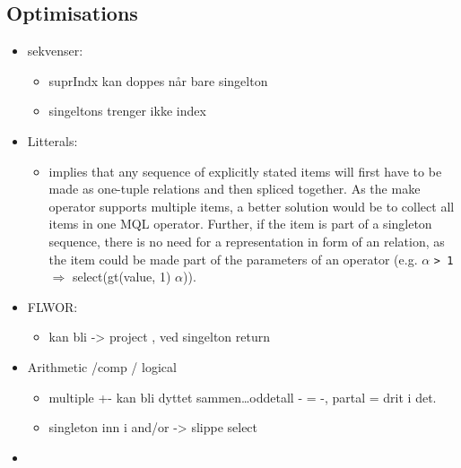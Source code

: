 \subsection{Optimisations}
\label{sect:trans:TD:optimisations}
\begin{itemize}
  \item sekvenser:
	  \begin{itemize}
	    \item suprIndx kan doppes n\aa r bare singelton
	    \item singeltons trenger ikke index
      \end{itemize} 
  \item Litterals: 
		\begin{itemize}
          \item implies that any sequence of
				explicitly stated items will first have to be made as one-tuple relations and
				then spliced together. As the \textsf{make} operator supports multiple items, a
					better solution would be to collect all items in one MQL operator. Further, if
					the item is part of a singleton sequence, there is no need for a representation
					in form of an relation, as the item could be made part of the parameters of an
					operator (e.g. $\alpha$ \texttt{> 1} $\Longrightarrow$
					\textsf{select(gt(value, 1) $\alpha$)}).   
        \end{itemize}
  \item FLWOR:
  	\begin{itemize}
        \item  kan bli -> project , ved singelton return
      \end{itemize}   
  \item Arithmetic /comp / logical
	\begin{itemize}
      \item multiple +- kan bli dyttet sammen\ldots oddetall - = -, partal = drit i det.
      \item singleton inn i and/or -> slippe select
    \end{itemize}
  \item             
\end{itemize}